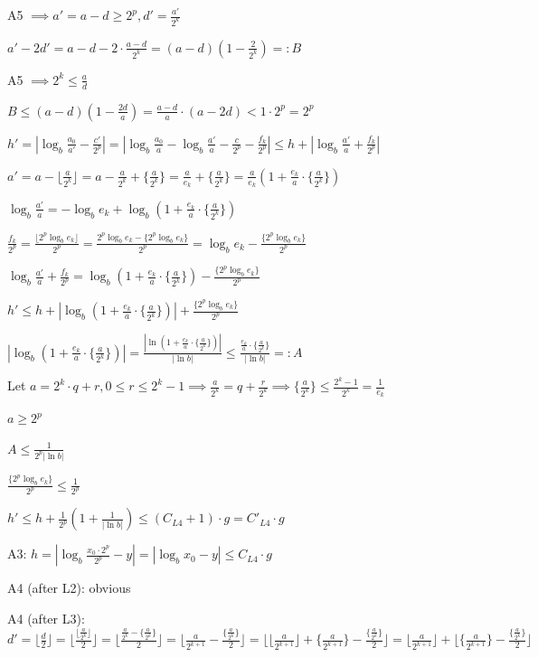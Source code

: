 \documentclass{article}
\begin{document}
A5 \( \implies a' = a - d \geq 2^p, d' = \frac{a'}{2^k} \)

\( a' - 2d'=a-d-2\cdot\frac{a-d}{2^k} = (a-d)(1 - \frac{2}{2^k}) =: B \)

A5 \( \implies 2^k \leq \frac{a}{d} \)

\( B \leq (a-d)(1-\frac{2d}{a}) = \frac{a-d}{a}\cdot(a-2d) < 1 \cdot 2^p = 2^p \)

\( h' = |\log_b\frac{a_0}{a'}-\frac{c'}{2^p}| = |\log_b\frac{a_0}{a}-\log_b\frac{a'}{a}-\frac{c}{2^p} - \frac{f_k}{2^p}| \leq h + |\log_b\frac{a'}{a} + \frac{f_k}{2^p} | \)

\( a'=a-\lfloor\frac{a}{2^k}\rfloor = a - \frac{a}{2^k} + \{ \frac{a}{2^k} \} = \frac{a}{e_k} + \{ \frac{a}{2^k} \} = \frac{a}{e_k}(1 + \frac{e_k}{a}\cdot \{ \frac{a}{2^k} \}) \)

\( \log_b\frac{a'}{a} = -\log_b{e_k} + \log_b{(1 + \frac{e_k}{a}\cdot \{ \frac{a}{2^k} \})} \)

\( \frac{f_k}{2^p} = \frac{\lfloor2^p\log_b{e_k}\rfloor}{2^p} = \frac{2^p\log_b{e_k} - \{2^p\log_b{e_k}\}}{2^p} = \log_b{e_k} - \frac{\{2^p\log_b{e_k}\}}{2^p} \)

\( \log_b\frac{a'}{a} + \frac{f_k}{2^p} = \log_b{(1 + \frac{e_k}{a}\cdot \{ \frac{a}{2^k} \})} - \frac{\{2^p\log_b{e_k}\}}{2^p} \)

\( h' \leq h + |\log_b{(1 + \frac{e_k}{a}\cdot \{ \frac{a}{2^k} \})}| + \frac{\{2^p\log_b{e_k}\}}{2^p} \)

\( |\log_b{(1 + \frac{e_k}{a}\cdot \{ \frac{a}{2^k} \})}| = \frac{|\ln{(1 + \frac{e_k}{a}\cdot \{ \frac{a}{2^k} \})}|}{|\ln{b}|} \leq \frac{\frac{e_k}{a}\cdot \{ \frac{a}{2^k} \}}{|\ln{b}|} =: A \)

Let \( a = 2^k\cdot q + r, 0 \leq r \leq 2^k - 1 \implies \frac{a}{2^k} = q + \frac{r}{2^k} \implies \{ \frac{a}{2^k} \} \leq \frac{2^k-1}{2^k} = \frac{1}{e_k} \)

\( a \geq 2^p \)

\( A \leq \frac{1}{2^p |\ln b| } \)

\( \frac{\{2^p\log_b{e_k}\}}{2^p} \leq \frac{1}{2^p} \)

\( h' \leq h + \frac{1}{2^p} (1 + \frac{1}{|\ln b|}) \leq (C_{L4} + 1) \cdot g = C'_{L4} \cdot g \)

A3: \( h = |\log_b\frac{x_0\cdot2^p}{2^p} - y| = |\log_b{x_0} - y| \leq C_{L4} \cdot g \)

A4 (after L2): obvious

A4 (after L3): \( d' = \lfloor\frac{d}{2}\rfloor = \lfloor\frac{\lfloor\frac{a}{2^k}\rfloor}{2}\rfloor = \lfloor\frac{\frac{a}{2^k} - \{\frac{a}{2^k}\}}{2}\rfloor = \lfloor\frac{a}{2^{k+1}} - \frac{\{\frac{a}{2^k}\}}{2}\rfloor = \lfloor\lfloor\frac{a}{2^{k+1}}\rfloor + \{\frac{a}{2^{k+1}}\} - \frac{\{\frac{a}{2^k}\}}{2}\rfloor = \lfloor\frac{a}{2^{k+1}}\rfloor + \lfloor \{\frac{a}{2^{k+1}}\} - \frac{\{\frac{a}{2^k}\}}{2}\rfloor \)
\end{document}
